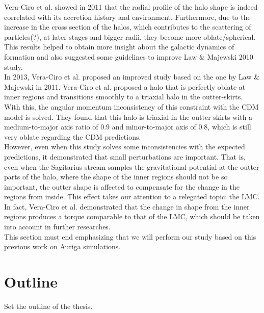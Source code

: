 Vera-Ciro et al.  showed in 2011 that the radial profile of the halo shape is indeed correlated with its accretion history and environment. Furthermore, due to the increase in the cross section of the halos, which contributes to the scattering of particles(?), at later stages and bigger radii, they become more oblate/spherical. This results helped to obtain more insight about the galactic dynamics of formation and also suggested some guidelines to improve Law & Majewski 2010 study.\\

In 2013, Vera-Ciro et al. proposed an improved study based on the one by Law & Majewski in 2011. Vera-Ciro et al. proposed a halo that is perfectly oblate at inner regions and transitions smoothly to a triaxial halo in the outter-skirts. With this, the angular momentum inconsistency of this constraint with the CDM model is solved. They found that this halo is triaxial in the outter skirts with a medium-to-major axis ratio of $0.9$ and minor-to-major axis of $0.8$, which is still very oblate regarding the CDM predictions.\\

However, even when this study solves some inconsistencies with the expected predictions, it demonstrated that small perturbations are important. That is, even when the Sagitarius stream samples the gravitational potential at the outter parts of the halo, where the shape of the inner regions should not be so important, the outter shape is affected to compensate for the change in the regions from inside. This effect takes our attention to a relegated topic: the LMC. In fact, Vera-Ciro et al. demonstrated that the change in shape from the inner regions produces a torque comparable to that of the LMC, which should be taken into account in further researches.\\

%

This section must end emphasizing that we will perform our study based on this previous work on Auriga simulations.

\section{Outline}

Set the outline of the thesis.